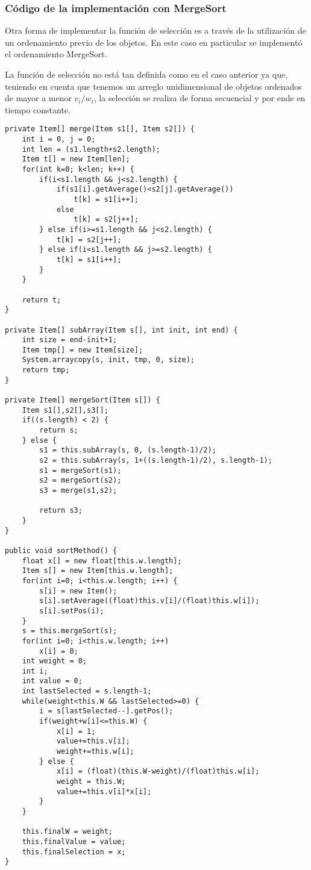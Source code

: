 \documentclass[a4paper,10pt,spanish]{article}
\begin{document}
	\subsubsection{C\'odigo de la implementaci\'on con MergeSort}
	\label{gre2}
	Otra forma de implementar la funci\'on de selecci\'on es a trav\'es de la utilizaci\'on de un ordenamiento previo de los objetos. En este caso en particular se implement\'o el ordenamiento MergeSort.
	
	La funci\'on de selecci\'on no est\'a tan definida como en el caso anterior ya que, teniendo en cuenta que tenemos un arreglo unidimensional de objetos ordenados de mayor a menor $v_i/w_i$, la selecci\'on se realiza de forma secuencial y por ende en tiempo constante.
	
		\begin{lstlisting}
private Item[] merge(Item s1[], Item s2[]) {
	int i = 0, j = 0;
	int len = (s1.length+s2.length);
	Item t[] = new Item[len];
	for(int k=0; k<len; k++) {
		if(i<s1.length && j<s2.length) {
			if(s1[i].getAverage()<s2[j].getAverage())
				t[k] = s1[i++];
			else
				t[k] = s2[j++];
		} else if(i>=s1.length && j<s2.length) {
			t[k] = s2[j++];
		} else if(i<s1.length && j>=s2.length) {
			t[k] = s1[i++];
		}
	}

	return t;
}

private Item[] subArray(Item s[], int init, int end) {
	int size = end-init+1;
	Item tmp[] = new Item[size];
	System.arraycopy(s, init, tmp, 0, size);
	return tmp;
}

private Item[] mergeSort(Item s[]) {
	Item s1[],s2[],s3[];
	if((s.length) < 2) {
		return s;
	} else {
		s1 = this.subArray(s, 0, (s.length-1)/2);
		s2 = this.subArray(s, 1+((s.length-1)/2), s.length-1);
		s1 = mergeSort(s1);
		s2 = mergeSort(s2);
		s3 = merge(s1,s2);
		
		return s3;
	}
}

public void sortMethod() {
	float x[] = new float[this.w.length];
	Item s[] = new Item[this.w.length];
	for(int i=0; i<this.w.length; i++) {
		s[i] = new Item();
		s[i].setAverage((float)this.v[i]/(float)this.w[i]);
		s[i].setPos(i);
	}
	s = this.mergeSort(s);
	for(int i=0; i<this.w.length; i++)
		x[i] = 0;
	int weight = 0;
	int i;
	int value = 0;
	int lastSelected = s.length-1;
	while(weight<this.W && lastSelected>=0) {
		i = s[lastSelected--].getPos();
		if(weight+w[i]<=this.W) {
			x[i] = 1;
			value+=this.v[i];
			weight+=this.w[i];
		} else {
			x[i] = (float)(this.W-weight)/(float)this.w[i];
			weight = this.W;
			value+=this.v[i]*x[i];
		}
	}

	this.finalW = weight;
	this.finalValue = value;
	this.finalSelection = x;
}
		\end{lstlisting}
\end{document}
